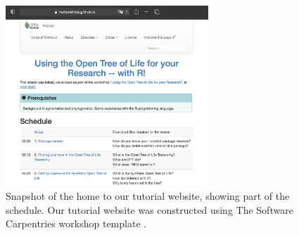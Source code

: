 \documentclass[12pt]{article}
\begin{document}
\begin{figure}
\begin{center}
\includegraphics[width=3in]{fig-schedule.png}
\end{center}
\caption{Snapshot of the home to our tutorial website, showing part of the schedule.
 Our tutorial website was constructed using The Software Carpentries workshop template \citep{swc-workshop-template}. \label{fig:schedule}}
\end{figure}

\pagebreak


\end{document}
